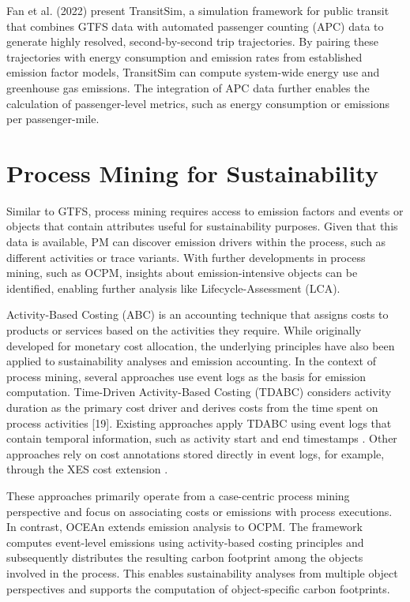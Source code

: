 Fan et al. (2022) \cite{fan2022transitsim} present TransitSim, a simulation framework for public transit that combines GTFS data with automated passenger counting (APC) data to generate highly resolved, second-by-second trip trajectories. By pairing these trajectories with energy consumption and emission rates from established emission factor models, TransitSim can compute system-wide energy use and greenhouse gas emissions. The integration of APC data further enables the calculation of passenger-level metrics, such as energy consumption or emissions per passenger-mile.






\section{Process Mining for Sustainability}
Similar to GTFS, process mining requires access to emission factors and events or objects that contain attributes useful for sustainability purposes. Given that this data is available, PM can discover emission drivers within the process, such as different activities or trace variants. With further developments in process mining, such as OCPM, insights about emission-intensive objects can be identified, enabling further analysis like Lifecycle-Assessment (LCA).




Activity-Based Costing (ABC) is an accounting technique that assigns costs to products or services based on the activities they require. While originally developed for monetary cost allocation, the underlying principles have also been applied to sustainability analyses and emission accounting. In the context of process mining, several approaches use event logs as the basis for emission computation. Time-Driven Activity-Based Costing (TDABC) considers activity duration as the primary cost driver and derives costs from the time spent on process activities [19]. Existing approaches apply TDABC using event logs that contain temporal information, such as activity start and end timestamps \cite{tdabc_pm}. Other approaches rely on cost annotations stored directly in event logs, for example, through the XES cost extension \cite{costawarepm}.



These approaches primarily operate from a case-centric process mining perspective and focus on associating costs or emissions with process executions. In contrast, OCEAn \cite{ocean} extends emission analysis to OCPM. The framework computes event-level emissions using activity-based costing principles and subsequently distributes the resulting carbon footprint among the objects involved in the process. This enables sustainability analyses from multiple object perspectives and supports the computation of object-specific carbon footprints.

